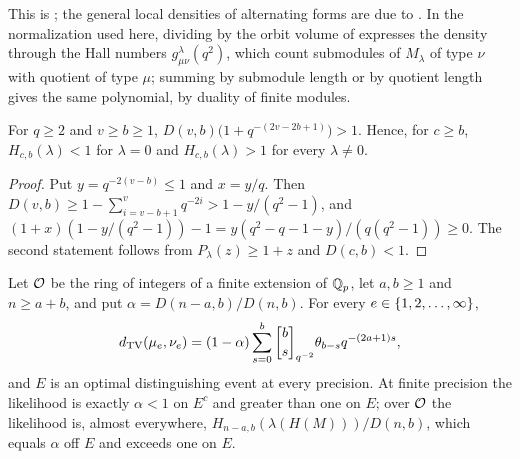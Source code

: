 This is \cite[Theorem~4.3 and Proposition~4.4]{Wakatsuki2005Igusa}; the general local densities of
alternating forms are due to \cite{HironakaSato1989Local}. In the normalization used here, dividing
\cite[Proposition~6.7]{Wakatsuki2005Igusa} by the orbit volume of \cite[Lemma~4.1]{Wakatsuki2005Igusa}
expresses the density through the Hall numbers $g^\lambda_{\mu\nu}(q^2)$, which count submodules of
$M_\lambda$ of type $\nu$ with quotient of type $\mu$; summing by submodule length or by quotient length
gives the same polynomial, by duality of finite modules.

\begin{lemma}\label{spn:lem:padic-gap}
For $q\ge2$ and $v\ge b\ge1$, $D(v,b)\bigl(1+q^{-(2v-2b+1)}\bigr)>1$. Hence, for $c\ge b$,
$H_{c,b}(\lambda)<1$ for $\lambda=0$ and $H_{c,b}(\lambda)>1$ for every $\lambda\ne0$.
\end{lemma}

\begin{proof}
Put $y=q^{-2(v-b)}\le1$ and $x=y/q$. Then $D(v,b)\ge1-\sum_{i=v-b+1}^vq^{-2i}>1-y/(q^2-1)$, and
$(1+x)(1-y/(q^2-1))-1=y(q^2-q-1-y)/(q(q^2-1))\ge0$. The second statement follows from
$P_\lambda(z)\ge1+z$ and $D(c,b)<1$.
\end{proof}

\begin{theorem}\label{spn:thm:padic-allpairs}
Let $\mathcal{O}$ be the ring of integers of a finite extension of $\mathbb{Q}_p$, let $a,b\ge1$ and $n\ge a+b$, and put
$\alpha=D(n-a,b)/D(n,b)$. For every $e\in\{1,2,\dots,\infty\}$,
\[
 \spnTV(\mu_e,\nu_e)=(1-\alpha)\sum_{s=0}^{b}\spnqbin bs{q^{-2}}\theta_{b-s}q^{-(2a+1)s},
\]
and $E$ is an optimal distinguishing event at every precision. At finite precision the likelihood is
exactly $\alpha<1$ on $E^c$ and greater than one on $E$; over $\mathcal{O}$ the likelihood is, almost
everywhere, $H_{n-a,b}(\lambda(H(M)))/D(n,b)$, which equals $\alpha$ off $E$ and exceeds one on $E$.
\end{theorem}

